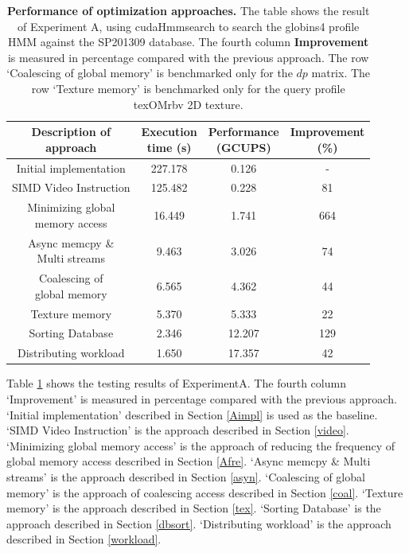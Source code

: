 \begin{table}[H]
\centering
\begin{tabular}{|c|c|c|c|}\hline
\shortstack{\textbf{Description of} \\ \textbf{approach}} & \shortstack{\textbf{Execution} \\ \textbf{time (s)}} & \shortstack{\textbf{Performance}\\ (GCUPS)} & \shortstack{\textbf{Improvement}\\ \textbf{(\%)}}\\\hline
Initial implementation & 227.178 & 0.126 & - \\\hline
SIMD Video Instruction & 125.482 & 0.228 & 81 \\\hline
\shortstack{Minimizing global\\memory access} & 16.449 & 1.741 & 664 \\\hline
\shortstack{Async memcpy \&\\Multi streams} & 9.463 & 3.026 & 74 \\\hline
\shortstack{Coalescing of\\global memory} & 6.565 & 4.362 & 44 \\\hline
Texture memory & 5.370 & 5.333 & 22 \\\hline
Sorting Database & 2.346 & 12.207 & 129 \\\hline
Distributing workload & 1.650 & 17.357 & 42 \\\hline
\end{tabular}
\caption{\selectfont \textbf{Performance of optimization approaches.} The table shows the result of Experiment A, using cudaHmmsearch to search the globins4 profile HMM against the SP201309 database. The fourth column \textbf{Improvement} is measured in percentage compared with the previous approach. The row `Coalescing of global memory' is benchmarked only for the $dp$ matrix. The row `Texture memory' is benchmarked only for the query profile texOMrbv 2D texture. \label{tab.opt}}
\end{table}

Table \ref{tab.opt} shows the testing results of ExperimentA. The fourth column `Improvement' is measured in percentage compared with the previous approach. `Initial implementation' described in Section \ref{Aimpl} is used as the baseline. `SIMD Video Instruction' is the approach described in Section \ref{video}. `Minimizing global memory access' is the approach of reducing the frequency of global memory access described in Section \ref{Afre}. `Async memcpy \& Multi streams' is the approach described in Section \ref{asyn}. `Coalescing of global memory' is the approach of coalescing access described in Section \ref{coal}. `Texture memory' is the approach described in Section \ref{tex}. `Sorting Database' is the approach described in Section \ref{dbsort}. `Distributing workload' is the approach described in Section \ref{workload}.

